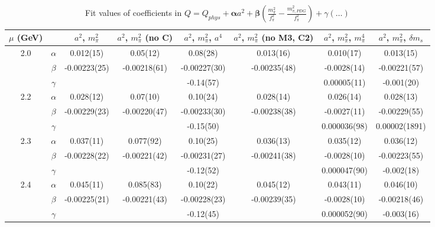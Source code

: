 \documentclass[12pt]{extarticle}
\begin{document}
\begin{table}[h!]
\begin{center}
\begin{tabular}{|c c|c|c|c|c|c|c|}
\hline
$\mu$ (GeV) &  & $a^2$, $m_\pi^2$& $a^2$, $m_\pi^2$ (no C)& $a^2$, $m_\pi^2$, $a^4$& $a^2$, $m_\pi^2$ (no M3, C2)& $a^2$, $m_\pi^2$, $m_\pi^4$& $a^2$, $m_\pi^2$, $\delta m_s$\\
\hline
\multirow{3}{0.5in}{2.0} & $\alpha$ & 0.012(15)& 0.05(12)& 0.08(28)& 0.013(16)& 0.010(17)& 0.013(15)\\
 & $\beta$ & -0.00223(25)& -0.00218(61)& -0.00227(30)& -0.00235(48)& -0.0028(14)& -0.00221(57)\\
 & $\gamma$ &  &  & -0.14(57)&  & 0.00005(11)& -0.001(20)\\
\hline
\multirow{3}{0.5in}{2.2} & $\alpha$ & 0.028(12)& 0.07(10)& 0.10(24)& 0.028(14)& 0.026(14)& 0.028(13)\\
 & $\beta$ & -0.00229(23)& -0.00220(47)& -0.00233(30)& -0.00238(38)& -0.0027(11)& -0.00229(55)\\
 & $\gamma$ &  &  & -0.15(50)&  & 0.000036(98)& 0.00002(1891)\\
\hline
\multirow{3}{0.5in}{2.3} & $\alpha$ & 0.037(11)& 0.077(92)& 0.10(25)& 0.036(13)& 0.035(12)& 0.036(12)\\
 & $\beta$ & -0.00228(22)& -0.00221(42)& -0.00231(27)& -0.00241(38)& -0.0028(10)& -0.00223(55)\\
 & $\gamma$ &  &  & -0.12(52)&  & 0.000047(90)& -0.002(18)\\
\hline
\multirow{3}{0.5in}{2.4} & $\alpha$ & 0.045(11)& 0.085(83)& 0.10(22)& 0.045(12)& 0.043(11)& 0.046(10)\\
 & $\beta$ & -0.00225(21)& -0.00221(43)& -0.00228(23)& -0.00239(35)& -0.0028(10)& -0.00218(46)\\
 & $\gamma$ &  &  & -0.12(45)&  & 0.000052(90)& -0.003(16)\\
\hline
\end{tabular}
\caption{Fit values of coefficients in $Q = Q_{phys} + \mathbf{\alpha} a^2 + \mathbf{\beta}\left(\frac{m_\pi^2}{f_\pi^2}-\frac{m_{\pi,PDG}^2}{f_\pi^2}\right) + \gamma(\ldots)$}
\end{center}
\end{table}






\end{document}
